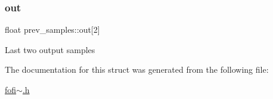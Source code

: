 \subsubsection{\texorpdfstring{out}{out}}
{\footnotesize\ttfamily float prev\+\_\+samples\+::out\mbox{[}2\mbox{]}}

Last two output samples 

The documentation for this struct was generated from the following file\+:\begin{DoxyCompactItemize}
\item 
\mbox{\hyperlink{fofi~_8h}{fofi$\sim$.\+h}}\end{DoxyCompactItemize}
